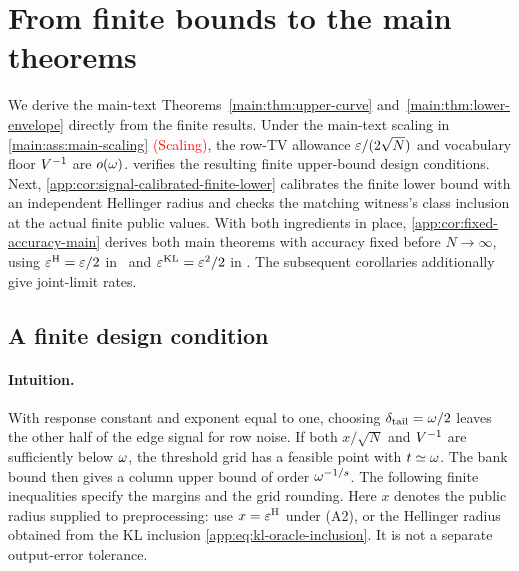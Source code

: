 \section{From finite bounds to the main theorems}
\label{app:benchmark-specializations}

We derive the main-text Theorems~\ref{main:thm:upper-curve}
and~\ref{main:thm:lower-envelope} directly from the finite results.
Under the main-text scaling in \textcolor{red}{\cref{main:ass:main-scaling}
(Scaling)}, the row-TV
allowance $\varepsilon/(2\sqrt N)$ and vocabulary floor
$V^{-1}$ are $o(\omega)$.
 verifies the resulting finite
upper-bound design conditions.
Next, \cref{app:cor:signal-calibrated-finite-lower} calibrates the finite
lower bound with an independent Hellinger radius and checks the matching
witness's class inclusion at the actual finite public values.
With both ingredients in place, \cref{app:cor:fixed-accuracy-main} derives
both main theorems with accuracy fixed before $N\to\infty$, using
$\varepsilon^{\mathrm H}=\varepsilon/2$ in \HellingerCase\ and
$\varepsilon^{\mathrm{KL}}=\varepsilon^2/2$ in \KLCase.
\ifincludeexponents
The subsequent corollaries additionally give joint-limit rates.
\fi

\subsection{A finite design condition}

\paragraph{Intuition.}
With response constant and exponent equal to one, choosing
$\delta_{\mathrm{tail}}=\omega/2$ leaves the other half of the edge signal
for row noise.  If both $x/\sqrt N$ and $V^{-1}$ are sufficiently
below $\omega$, the threshold grid has a feasible point with
$t\simeq\omega$.  The bank bound then gives a column
upper bound of order $\omega^{-1/s}$.
The following finite inequalities specify the margins and the grid rounding.
Here $x$ denotes the public radius supplied to preprocessing:
use $x=\varepsilon^{\mathrm H}$ under (A2), or the Hellinger radius obtained from
the KL inclusion \eqref{app:eq:kl-oracle-inclusion}.  It is not a separate
output-error tolerance.

